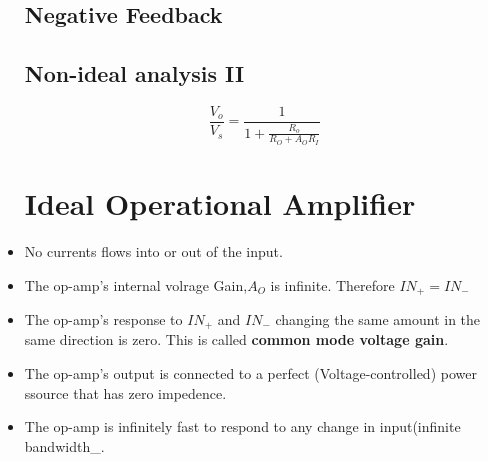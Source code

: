 \documentclass[12pt]{article}
\begin{document}
\begin{itemize}
\subsection{Negative Feedback}
\subsection{Non-ideal analysis II}
\begin{displaymath}
\frac{V_o}{V_s}=\frac{1}{1+\frac{R_o}{R_O+A_OR_I}}
\end{displaymath}
\section{Ideal Operational Amplifier}
\item No currents flows into or out of the input.
\item The op-amp's internal volrage Gain,$A_O$ is infinite. Therefore $IN_+=IN_-$
\item The op-amp's response to $IN_+$ and $IN_-$ changing the same amount in the same direction is zero. This is called \textbf{common mode voltage gain}.
\item The op-amp's output is connected to a perfect (Voltage-controlled) power ssource that has zero impedence.
\item The op-amp is infinitely fast to respond to any change in input(infinite bandwidth_.
\end{itemize}
\end{document}
